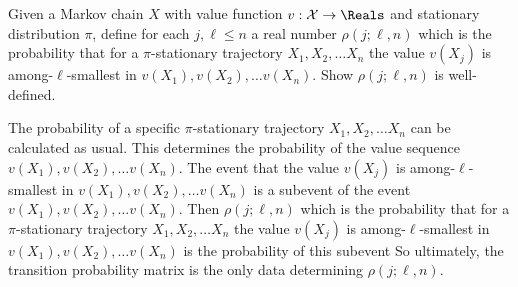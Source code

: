 \documentclass[12pt]{article}
\begin{document}
\begin{exercise}
    Given a Markov chain \( X \) with value function \( v:  \mathcal{X}
    \to \Reals \) and stationary distribution \( \pi \), define for each
    \( j, \ell \le n \) a real number \( \rho(j; \ell, n) \) which is
    the probability that for a \( \pi \)-stationary trajectory \( X_1, X_2,
    \dots X_n \) the value \( v(X_j) \) is among-\( \ell \)-smallest in \(
    v(X_1), v(X_2), \dots v(X_n) \).  Show \( \rho(j; \ell, n) \) is
    well-defined.
\end{exercise}
\begin{solution}
    The probability of a specific \( \pi \)-stationary trajectory \( X_1, X_2,
    \dots X_n \) can be calculated as usual.  This determines the probability of
    the value sequence \( v(X_1), v(X_2), \dots v(X_n) \).
    The event that the value \( v(X_j) \) is among-\( \ell \)-smallest
    in \( v(X_1), v(X_2), \dots v(X_n) \) is a subevent of the event \(
    v(X_1), v(X_2), \dots v(X_n) \).  Then \( \rho(j; \ell, n) \) which
    is the probability that for a \( \pi \)-stationary trajectory \( X_1,
    X_2, \dots X_n \) the value \( v(X_j) \) is among-\( \ell \)-smallest
    in \( v(X_1), v(X_2), \dots v(X_n) \) is the probability of this
    subevent  So ultimately, the transition probability matrix is the
    only data determining \( \rho(j; \ell, n) \).
\end{solution}
\end{document}
